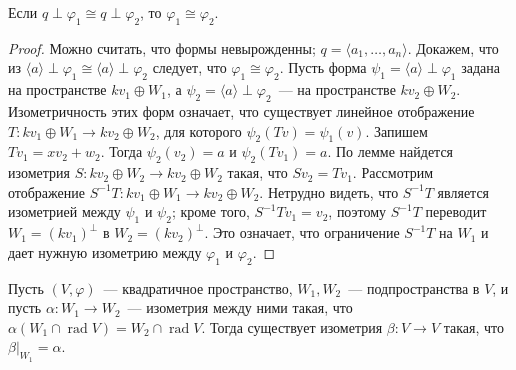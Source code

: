 \documentclass[a4paper,oneside,12pt]{article}
\theoremstyle{plain} { \swapnumbers
\newtheorem{theorem}{Теорема}[subsection]
\newtheorem{corollary}[theorem]{Следствие}
\newtheorem{lemma}[theorem]{Лемма}
\newtheorem{proposition}[theorem]{Утверждение}
\newtheorem{claim}[theorem]{Факт}
}
\theoremstyle{definition} { \swapnumbers
\newtheorem{definition}[theorem]{Определение}
\newtheorem{notation}[theorem]{Обозначение}
\newtheorem{remark}[theorem]{Замечание}
\newtheorem{remarks}[theorem]{Замечания}
\newtheorem{example}[theorem]{Пример}
\newtheorem{examples}[theorem]{Примеры}
\newtheorem{sssection}[theorem]{}
}
\def\ph{\varphi}
\def\la{\langle}
\def\ra{\rangle}
\def\rad{\operatorname{rad}}
\def\a{\alpha}
\def\b{\beta}
\begin{document}
\begin{theorem}
Если $q\perp\ph_1\cong q\perp\ph_2$, то $\ph_1\cong\ph_2$.
\end{theorem}
\begin{proof}
Можно считать, что формы невырожденны; $q=\la a_1,\dots,a_n\ra$. Докажем, что из
$\la a\ra\perp\ph_1\cong\la a\ra\perp\ph_2$ следует, что $\ph_1\cong\ph_2$.
Пусть форма $\psi_1=\la a\ra\perp\ph_1$ задана на пространстве $kv_1\oplus W_1$,
а $\psi_2=\la a\ra\perp\ph_2$~--- на пространстве $kv_2\oplus W_2$. Изометричность
этих форм означает, что существует линейное отображение $T\colon kv_1\oplus W_1\to kv_2\oplus W_2$,
для которого $\psi_2(Tv)=\psi_1(v)$.
Запишем $Tv_1=xv_2+w_2$. Тогда
$\psi_2(v_2)=a$ и $\psi_2(Tv_1)=a$. По лемме найдется изометрия $S\colon kv_2\oplus W_2\to kv_2\oplus W_2$
такая, что $Sv_2=Tv_1$. Рассмотрим отображение $S^{-1}T\colon kv_1\oplus W_1\to kv_2\oplus W_2$.
Нетрудно видеть, что $S^{-1}T$ является изометрией между $\psi_1$ и $\psi_2$;
кроме того, $S^{-1}Tv_1=v_2$, поэтому $S^{-1}T$ переводит $W_1=(kv_1)^\perp$ в $W_2=(kv_2)^\perp$.
Это означает, что ограничение $S^{-1}T$ на $W_1$ и дает нужную изометрию между $\ph_1$ и $\ph_2$.
\end{proof}

\begin{corollary}\label{cor:isometry-extension}
Пусть $(V,\ph)$~--- квадратичное пространство, $W_1,W_2$~--- подпространства в $V$,
и пусть $\a\colon W_1\to W_2$~--- изометрия между ними такая,
что $\a(W_1\cap\rad V) = W_2\cap\rad V$.
Тогда существует изометрия $\b\colon V\to V$ такая, что $\b|_{W_1}=\a$.
\end{corollary}
\end{document}
